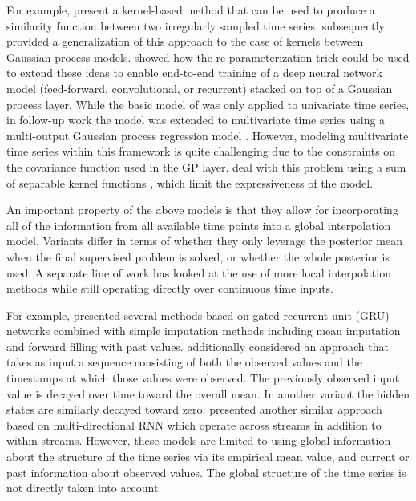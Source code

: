 \documentclass{article} \usepackage{iclr2019_conference,times}
\begin{document}
For example, \cite{Lu2008} present a kernel-based method that can be used
to produce a similarity function between two irregularly sampled time
series. \cite{li2015classification} subsequently provided a  
generalization of this approach to the case of kernels between Gaussian
process models. \cite{li2016scalable} showed how the re-parameterization trick
\citep{kingma2015variational} could be used to extend these ideas to enable 
end-to-end training of a deep neural network model
(feed-forward, convolutional, or recurrent)
stacked on top of a Gaussian process layer. While the basic model of \cite{li2016scalable}
was only applied to univariate time series, in follow-up work the 
model was extended to multivariate time series using a multi-output
Gaussian process regression model \citep{futoma2017improved}. 
However, modeling multivariate time series within this framework 
is quite challenging due to the constraints on the covariance function
used in the GP layer. \citet{futoma2017improved}
deal with this problem using a sum of separable kernel
functions \citep{bonilla2008multi}, which limit the expressiveness
of the model.

An important property of the above models is that they allow for incorporating 
all of the information from all available time points into a global interpolation 
model. Variants differ in terms of whether they only leverage the posterior
mean when the final supervised problem is solved, or whether the whole posterior is 
used. A separate line of work has looked at the use of more local interpolation
methods while still operating directly over continuous time inputs.

For example, \citet{che2016recurrent}
presented several methods based on  gated recurrent unit (GRU) networks
\citep{gru} combined with simple imputation methods
including mean imputation and forward filling with past values. 
\citet{che2016recurrent} additionally considered an approach 
that takes as input a sequence consisting of both the
observed values and the timestamps at which those values were observed. 
The previously observed input value is decayed over time 
toward the overall mean. In another variant the hidden states are 
similarly decayed toward zero. \cite{Yoon_mRNN} presented another similar approach based on multi-directional RNN which operate across streams in addition to
within streams. However, these models are limited to using 
global information about the structure of the time series via its 
empirical mean value, and current or past information about
observed values. The global structure of the time series is not directly
taken into account.  
\end{document}

